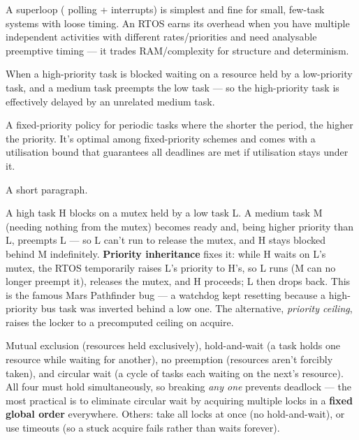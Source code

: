 A superloop ( polling + interrupts) is simplest and fine for
small, few-task systems with loose timing. An RTOS earns its overhead when you
have multiple independent activities with different rates/priorities and need
analysable preemptive timing --- it trades RAM/complexity for structure and
determinism.

When a high-priority task is blocked waiting on a resource held by a
low-priority task, and a medium task preempts the low task --- so the
high-priority task is effectively delayed by an unrelated medium task.

A fixed-priority policy for periodic tasks where the shorter the period, the
higher the priority. It's optimal among fixed-priority schemes and comes with a
utilisation bound that guarantees all deadlines are met if utilisation stays
under it.

%
{A short paragraph.}

A high task H blocks on a mutex held by a low task L. A medium task M (needing
nothing from the mutex) becomes ready and, being higher priority than L,
preempts L --- so L can't run to release the mutex, and H stays blocked behind
M indefinitely. \textbf{Priority inheritance} fixes it: while H waits on L's
mutex, the RTOS temporarily raises L's priority to H's, so L runs (M can no
longer preempt it), releases the mutex, and H proceeds; L then drops back. This
is the famous Mars Pathfinder bug --- a watchdog kept resetting because a
high-priority bus task was inverted behind a low one. The alternative,
\emph{priority ceiling}, raises the locker to a precomputed ceiling on acquire.

Mutual exclusion (resources held exclusively), hold-and-wait (a task holds one
resource while waiting for another), no preemption (resources aren't forcibly
taken), and circular wait (a cycle of tasks each waiting on the next's
resource). All four must hold simultaneously, so breaking \emph{any one}
prevents deadlock --- the most practical is to eliminate circular wait by
acquiring multiple locks in a \textbf{fixed global order} everywhere. Others:
take all locks at once (no hold-and-wait), or use timeouts (so a stuck acquire
fails rather than waits forever).

